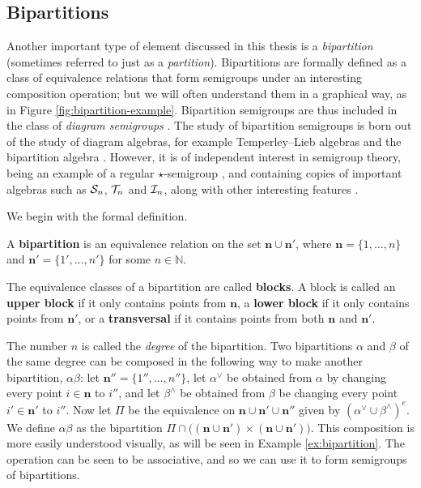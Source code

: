 \subsection{Bipartitions}
\label{sec:bipartitions}

Another important type of element discussed in this thesis is a
\textit{bipartition} (sometimes referred to just as a \textit{partition}).
Bipartitions are formally defined as a class of equivalence relations that form
semigroups under an interesting composition operation; but we will often
understand them in a graphical way, as in Figure \ref{fig:bipartition-example}.
Bipartition semigroups are thus included in the class of \textit{diagram
  semigroups} \cite{diagram_semigroups}.  The study of bipartition semigroups is
born out of the study of diagram algebras, for example Temperley--Lieb algebras
and the bipartition algebra \cite{partition_algebra}.  However, it is of
independent interest in semigroup theory, being an example of a regular
$\star$-semigroup \cite{reg_star_smgp}, and containing copies of important
algebras such as $\mathcal{S}_n$, $\mathcal{T}_n$ and $\mathcal{I}_n$, along with other interesting
features \cite[\S1]{deg_motzkin}.

We begin with the formal definition.

\begin{definition}
  \label{def:bipartition}
  A \textbf{bipartition} is an equivalence relation on the set
  $\mathbf{n} \cup \mathbf{n}'$, where $\mathbf{n} = \{1, \ldots, n\}$ and
  $\mathbf{n}' = \{1', \ldots, n'\}$ for some $n \in \mathbb{N}$.
\end{definition}

The equivalence classes of a bipartition are called \textbf{blocks}.  A block is
called an \textbf{upper block} if it only contains points from $\mathbf{n}$, a
\textbf{lower block} if it only contains points from $\mathbf{n}'$, or a
\textbf{transversal} if it contains points from both $\mathbf{n}$ and
$\mathbf{n}'$.

The number $n$ is called the \textit{degree} of the
bipartition.   Two
bipartitions $\alpha$ and $\beta$ of the same degree can be composed in the
following way to make another bipartition, $\alpha \beta$: let
$\mathbf{n}'' = \{1'', \ldots, n''\}$, let $\alpha^\vee$ be obtained from
$\alpha$ by changing every point $i \in \mathbf{n}$ to $i''$, and let
$\beta^\wedge$ be obtained from $\beta$ be changing every point
$i' \in \mathbf{n}'$ to $i''$.  Now let $\Pi$ be the equivalence on
$\mathbf{n} \cup \mathbf{n}' \cup \mathbf{n}''$ given by
$(\alpha^\vee \cup \beta^\wedge)^e$.  We define $\alpha \beta$ as the
bipartition
$\Pi \cap \big((\mathbf{n} \cup \mathbf{n}') \times (\mathbf{n} \cup
\mathbf{n}')\big)$.  This composition is more easily understood visually, as
will be seen in Example \ref{ex:bipartition}.  The operation can be seen to be
associative, and so we can use it to form semigroups of bipartitions.

